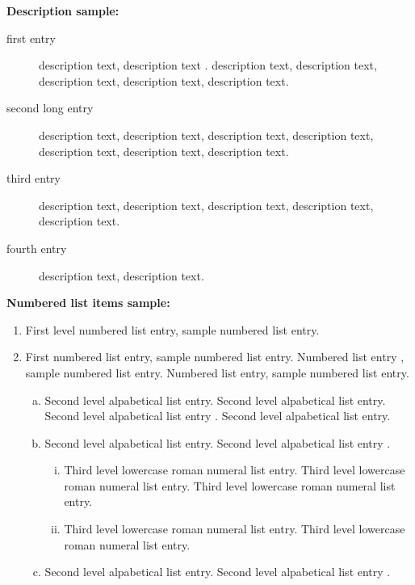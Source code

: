 \documentclass[ASNA,twocolumn]{USG} %
\begin{document}
{\textbf{Description sample:}
\begin{description}
\item[first entry] description text, description text \cite{Knupp1999,Taylor1937}. description text, description text, description text, description text, description text.
\item[second long entry] description text, description text, description text, description text, description text, description text, description text.
\item[third entry] description text, description text, description text, description text, description text.
\item[fourth entry] description text, description text.
\end{description}\medskip

\textbf{Numbered list items sample:}
\begin{enumerate}
\item First level numbered list entry, sample numbered list entry.

\item First numbered list entry, sample numbered list entry. Numbered list entry \cite{Taylor1937}, sample numbered list entry. Numbered list entry, sample numbered list entry.

\begin{enumerate}[a.]
\item Second level alpabetical list entry. Second level alpabetical list entry. Second level alpabetical list entry \cite{Hoch2009}. Second level alpabetical list entry.

\item Second level alpabetical list entry. Second level alpabetical list entry \cite{Hirt1974,Benson1992}.

\begin{enumerate}[i.]
\item Third level lowercase roman numeral list entry. Third level lowercase roman numeral list entry. Third level lowercase roman numeral list entry.

\item Third level lowercase roman numeral list entry. Third level lowercase roman numeral list entry. \cite{Benson1992}
\end{enumerate}

\item Second level alpabetical list entry. Second level alpabetical list entry \cite{Dukowicz1984}.
\end{enumerate}


\end{enumerate}}
\end{document}
